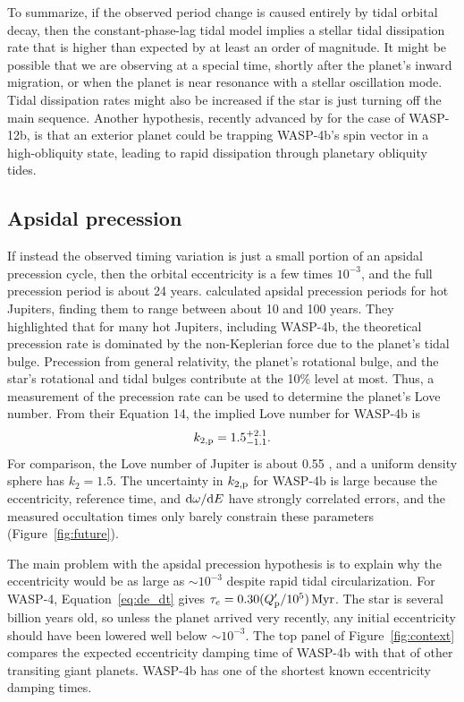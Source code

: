 \documentclass[12pt,twocolumn,tighten]{aastex62}
\begin{document}
To summarize, if the observed period change is caused entirely by
tidal orbital decay, then the constant-phase-lag tidal model implies a
stellar tidal dissipation rate that is higher than expected by at
least an order of magnitude.  It might be possible that we are
observing at a special time, shortly after the planet's inward
migration, or when the planet is near resonance with a stellar
oscillation mode.  Tidal dissipation rates might also be increased if
the star is just turning off the main sequence.  Another hypothesis,
recently advanced by \citet{millholland_obliquity_2018} for the case
of WASP-12b, is that an exterior planet could be trapping WASP-4b's
spin vector in a high-obliquity state, leading to rapid dissipation
through planetary obliquity tides.

\subsection{Apsidal precession}
\label{sec:apsidal_precession}

If instead the observed timing variation is just a small portion of an
apsidal precession cycle, then the orbital eccentricity is a few times
$10^{-3}$, and the full precession period is about 24 years.
\citet{ragozzine_probing_2009} calculated apsidal precession periods
for hot Jupiters, finding them to range between about 10 and 100
years. They highlighted that for many hot Jupiters, including WASP-4b,
the theoretical precession rate is dominated by the non-Keplerian
force due to the planet's tidal bulge.  Precession from general
relativity, the planet's rotational bulge, and the star's rotational
and tidal bulges contribute at the 10\% level at most.  Thus, a
measurement of the precession rate can be used to determine the
planet's Love number.  From their Equation 14, the implied Love number
for WASP-4b is
\begin{equation}
k_{2,{\rm p}} = 1.5^{+2.1}_{-1.1}.
\end{equation}
For comparison, the Love number of Jupiter is about 0.55
\citep{wahl_tidal_2016,ni_empirical_2018}, and a uniform density
sphere has $k_2 = 1.5$. The uncertainty in $k_{2,{\rm p}}$ for WASP-4b
is large because the eccentricity, reference time, and ${\rm
d}\omega/{\rm d}E$ have strongly correlated errors, and the measured
occultation times only barely constrain these parameters
(Figure~\ref{fig:future}).

The main problem with the apsidal precession hypothesis is to explain
why the eccentricity would be as large as $\sim$$10^{-3}$ despite
rapid tidal circularization.  For WASP-4, Equation~\ref{eq:de_dt}
gives $\tau_e = 0.30 (Q_{\rm p}'/10^5) \, {\rm Myr}$.  The star is
several billion years old, so unless the planet arrived very recently,
any initial eccentricity should have been lowered well below
$\sim$$10^{-3}$.  The top panel of Figure~\ref{fig:context} compares
the expected eccentricity damping time of WASP-4b with that of other
transiting giant planets.  WASP-4b has one of the shortest known
eccentricity damping times.
\end{document}
